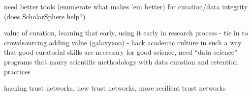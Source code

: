 \documentclass{acm_proc_article-sp}
\begin{document}
need better tools (enumerate what makes 'em better) for curation/data
integrity (does ScholarSphere help?)

value of curation, learning that early, using it early in research process -
tie in to crowdsourcing adding value (galaxyzoo) - hack academic culture in
such a way that good curatorial skills are necessary for good science, need
``data science'' programs that marry scientific methodology with data curation
and retention practices

hacking trust networks, new trust networks, more resilient trust networks

{}



\end{document}
